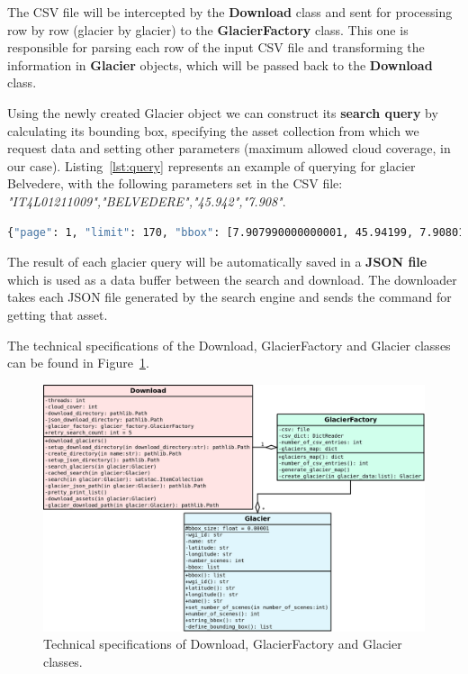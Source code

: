 \documentclass[12pt, a4paper]{report}
\begin{document}
	\par The CSV file will be intercepted by the \textbf{Download } class and sent for processing row by row (glacier by glacier) to the \textbf{GlacierFactory} class. This one is responsible for parsing each row of the input CSV file and transforming the information in \textbf{Glacier} objects, which will be passed back to the \textbf{Download} class.
	
	\par Using the newly created Glacier object we can construct its \textbf{search query} by calculating its bounding box, specifying the asset collection from which we request data and setting other parameters (maximum allowed cloud coverage, in our case). Listing~\ref{lst:query} represents an example of querying for glacier Belvedere, with the following parameters set in the CSV file: \textit{"IT4L01211009","BELVEDERE","45.942","7.908"}.
	
	\begin{lstlisting}[caption={Search query created by sat-search},label={lst:query},language=Bash]
		{"page": 1, "limit": 170, "bbox": [7.907990000000001, 45.94199, 7.90801, 45.94201], "query": {"eo:cloud_cover": {"lt": 10}}, "collection": "landsat-8-l1"}
	\end{lstlisting}

	\par The result of each glacier query will be automatically saved in a \textbf{JSON file} which is used as a data buffer between the search and download. The downloader takes each JSON file generated by the search engine and sends the command for getting that asset.
	
	\par The technical specifications of the Download, GlacierFactory and Glacier classes can be found in Figure~\ref{fig:sd_diagram}.
	
	\begin{figure}[h]
		\centering
		\includegraphics[scale=0.23]{../images/sd_diagram.png}
		\caption{Technical specifications of Download, GlacierFactory and Glacier classes.}
		\label{fig:sd_diagram}
	\end{figure}
\end{document}
